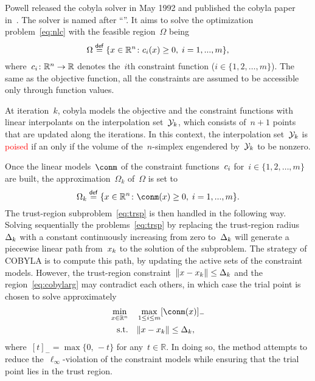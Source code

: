 \documentclass[11pt,draft]{article}
\numberwithin{equation}{section}
\newcommand{\R}{\mathbb{R}}
\newcommand{\norm}[2][]{#1\lVert#2#1\rVert}
\newcommand{\set}[2][]{#1\{#2#1\}}
\newcommand{\eqdef}{\mathrel{\stackrel{\mathsf{def}}{=}}}
\newcommand{\con}[1][i]{c\ifthenelse{\equal{#1}{}}{}{_{#1}}}
\newcommand{\fset}{\Omega}
\newcommand{\fsetm}[1][k]{\Omega_{#1}}
\newcommand{\iter}[1][k]{x\ifthenelse{\equal{#1}{}}{}{_{#1}}}
\newcommand{\rad}[1][k]{\Delta\ifthenelse{\equal{#1}{}}{}{_{#1}}}
\newcommand{\st}{\text{s.t.}}
\newcommand{\xpt}[1][k]{\mathcal{Y}\ifthenelse{\equal{#1}{}}{}{_{#1}}}
\newcommand\alert[1]{\textcolor{red}{#1}}
\begin{document}
Powell released the \gls{cobyla} solver in May 1992 and published the \gls{cobyla}
paper\cite{Powell_1994} in~. The solver is named after \enquote{}.
It aims to solve the optimization problem~\eqref{eq:nlc} with the feasible region~$\fset$
being
\[
    \fset \eqdef \set{x \in \R^n \colon \con(x) \ge 0,\; i=1,...,m},
\]
where~$\con \colon \R^n \to \R$ denotes the~$i$th constraint function ($i \in \set{1, 2, \dots, m}$).
The same as the objective function, all the constraints are assumed to be accessible only through function values.

At iteration~$k$, \gls{cobyla} models the objective and the constraint functions with {linear}
interpolants on the interpolation set~$\xpt$, which consists of~$n+1$ points that are updated
along the iterations.
In this context, the interpolation set~$\xpt$ is \alert{poised} if an only if
the volume of the~$n$-simplex engendered by~$\xpt$ to be nonzero.

Once the linear models~$\conm$ of the constraint functions~$\con$ for~$i \in \set{1, 2, \dots, m}$
are built, the approximation~$\fsetm$ of~$\fset$ is set to
\begin{equation}
    \label{eq:cobylarg}
    \fsetm \eqdef \set{x \in \R^n \colon \conm(x) \ge 0,\; i=1,...,m}.
\end{equation}
The trust-region subproblem~\eqref{eq:trsp} is then handled in the following way.
Solving sequentially the problems~\eqref{eq:trsp} by replacing the trust-region radius~$\rad$ with
a constant continuously increasing from zero to~$\rad$ will generate a piecewise linear
path from~$\iter$ to the solution of the subproblem.
The strategy of COBYLA is to compute this path, by updating the active sets of the constraint models.
However, the trust-region constraint~$\|x-x_k\|\le \rad$
and the region~\eqref{eq:cobylarg} may contradict each others, in which case the trial point is
chosen to solve approximately
\begin{align*}
    \min_{x \in \R^n}   & \quad \max_{1\le i \le m} [\conm(x)]_{-}\\
    \st         & \quad \norm{x - \iter} \le \rad,
\end{align*}
where~$[t]_{-}= \max\{0,\,-t\}$ for any~$t\in \R$.
In doing so, the method attempts to reduce the~$\ell_\infty$-violation of the constraint models while ensuring
that the trial point lies in the trust region.
\end{document}
